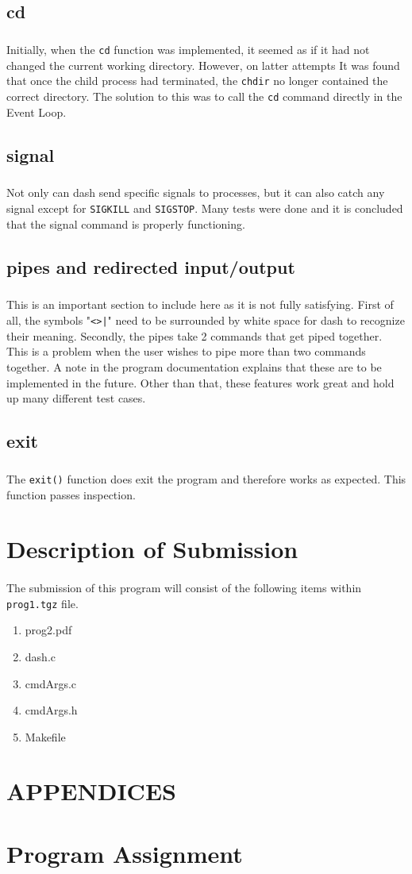 \documentclass[10pt]{article}
\begin{document}
\subsection{cd}
\subparagraph{}
Initially, when the \texttt{cd} function was implemented, it seemed as if it had not changed the current working directory. However, on latter attempts It was found that once the child process had terminated, the \texttt{chdir} no longer contained the correct directory. The solution to this was to call the \texttt{cd} command directly in the Event Loop.

\subsection{signal}
\subparagraph{}
Not only can dash send specific signals to processes, but it can also catch any signal except for \texttt{SIGKILL} and \texttt{SIGSTOP}. Many tests were done and it is concluded that the signal command is properly functioning.

\subsection{pipes and redirected input/output}
\subparagraph{}
This is an important section to include here as it is  not fully satisfying. First of all, the symbols "\texttt{<>|}" need to be surrounded by white space for dash to recognize their meaning. Secondly, the pipes take 2 commands that get piped together. This is a problem when the user wishes to pipe more than two commands together. A note in the program documentation explains that these are to be implemented in the future. Other than that, these features work great and hold up many different test cases.

\subsection{exit}
\subparagraph{}
The \texttt{exit()} function does exit the program and therefore works as expected. This function passes inspection.


\section{Description of Submission}
\paragraph{}
The submission of this program will consist of the following items within \texttt{prog1.tgz} file.

\begin{enumerate}[noitemsep]
\item prog2.pdf
\item dash.c
\item cmdArgs.c
\item cmdArgs.h
\item Makefile
\end{enumerate}

\vfill
\section{APPENDICES}
\appendix

\section{Program Assignment}

\end{document}
